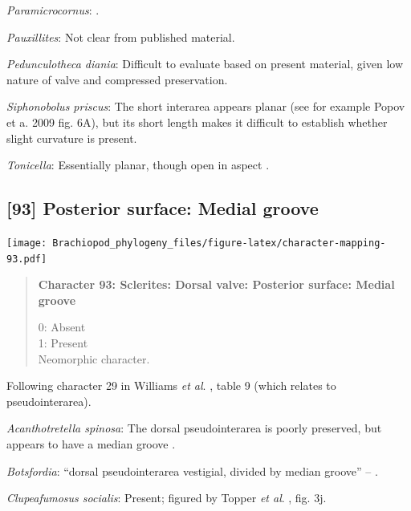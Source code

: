 \documentclass[openany]{book}
\begin{document}
\hypertarget{Paramicrocornus-coding-92}{}
\emph{Paramicrocornus}: \citet{Zhang2018Ahyolithid}.

\hypertarget{Pauxillites-coding-92}{}
\emph{Pauxillites}: Not clear from published material.

\hypertarget{Pedunculotheca_diania-coding-92}{}
\emph{Pedunculotheca diania}: Difficult to evaluate based on present
material, given low nature of valve and compressed preservation.

\hypertarget{Siphonobolus_priscus-coding-92}{}
\emph{Siphonobolus priscus}: The short interarea appears planar (see for
example Popov et a. 2009 fig. 6A), but its short length makes it
difficult to establish whether slight curvature is present.

\hypertarget{Tonicella-coding-92}{}
\emph{Tonicella}: Essentially planar, though open in aspect
\citep[following Chiton in][]{Schwabe2010}.

\subsection*{{[}93{]} Posterior surface: Medial
groove}\label{posterior-surface-medial-groove}

\texttt{[image: Brachiopod\_phylogeny\_files/figure-latex/character-mapping-93.pdf]}

\begin{quote}
\textbf{Character 93: Sclerites: Dorsal valve: Posterior surface: Medial
groove}

0: Absent\\
1: Present\\
Neomorphic character.
\end{quote}

Following character 29 in Williams \emph{et al}.
\citeyearpar{Williams2000LinguliformeaCraniiformea}, table 9 (which
relates to pseudointerarea).

\hypertarget{Acanthotretella_spinosa-coding-93}{}
\emph{Acanthotretella spinosa}: The dorsal pseudointerarea is poorly
preserved, but appears to have a median groove
\citep{Holmer2006Aspinose}.

\hypertarget{Botsfordia-coding-93}{}
\emph{Botsfordia}: ``dorsal pseudointerarea vestigial, divided by median
groove'' -- \citet{Williams2000LinguliformeaCraniiformea}.

\hypertarget{Clupeafumosus_socialis-coding-93}{}
\emph{Clupeafumosus socialis}: Present; figured by Topper \emph{et al}.
\citeyearpar{Topper2013Reappraisalof}, fig. 3j.
\end{document}
